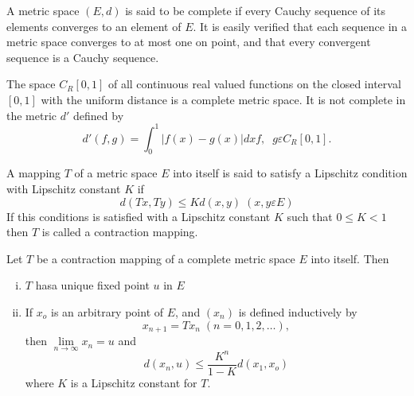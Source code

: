  A metric space $(E,d)$ is said to be complete if every Cauchy
 sequence of its elements converges to an element of $E$. It is easily
 verified that each sequence in a metric space converges to at most
 one on point, and that every convergent sequence is a Cauchy
 sequence. 
 
\begin{example*}%
 The space $C_R [0,1]$ of all continuous real valued functions on the
 closed interval $[0,1]$ with the uniform distance is a complete
 metric space. It is not complete in the metric $d'$ defined by  
 $$
 d'(f,g) = \int_{0}^{1} |f (x) -g (x) |dx f, \;\; g \varepsilon C_R [0,1].
 $$
 \end{example*}
 
\begin{Definition}%
  A mapping $T$ of a metric space $E$ into itself is said to satisfy a
  Lipschitz condition with Lipschitz constant $K$ if  
  $$
  d (Tx , Ty) \leq K d(x,y)\;  (x,y \varepsilon E )
  $$
  If this conditions is satisfied with a Lipschitz constant $K$ such
  that $0 \leq K < 1$ then $T$ is called a contraction mapping. 
\end{Definition} 

\begin{thmm}\label{chap1:thm1.1}%
  Let $T$ be a contraction mapping
  of a complete metric space $E$ into itself. Then 
  \begin{enumerate}[i)]
  \item $T$ has\pageoriginale a unique fixed point $u$ in $E$

  \item If $x_o$ is an arbitrary point of $E$, and $(x_n)$ is defined
    inductively by 
  $$
  x_{n+1} = Tx_n \; (n=0, 1,2,\ldots),
  $$
  then $\lim\limits_{n \to \infty} x_n = u$ and
  $$
  d(x_n, u) \leq \frac{K^n }{1-K} d (x_1, x_o)
  $$
  where $K$ is a Lipschitz constant for $T$.
  \end{enumerate}
\end{thmm} 

